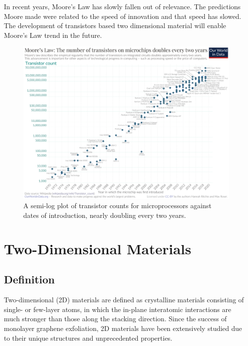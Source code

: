 \documentclass[12pt,a4paper]{report}
\begin{document}
In recent years, Moore’s Law has slowly fallen out of relevance. The predictions Moore made were related to the speed of innovation and that speed has slowed. The development of transistors based two dimensional material will enable Moore’s Law trend in the future. 



\begin{figure}
  \centering
  \includegraphics[scale=0.3]{Moore's_Law_Transistor_Count.png}
  \caption{ A semi-log plot of transistor counts for microprocessors against dates of introduction, nearly doubling every two years.}
  \label{moores}
  \end{figure}

\chapter{Two-Dimensional Materials}
\section{Definition}

Two-dimensional (2D) materials are defined as crystalline materials consisting 
of single- or few-layer atoms, in which the in-plane interatomic interactions 
are much stronger than those along the stacking direction. Since the success of 
monolayer graphene exfoliation, 2D materials have been extensively studied due
 to their unique structures and unprecedented properties. 
\end{document}
